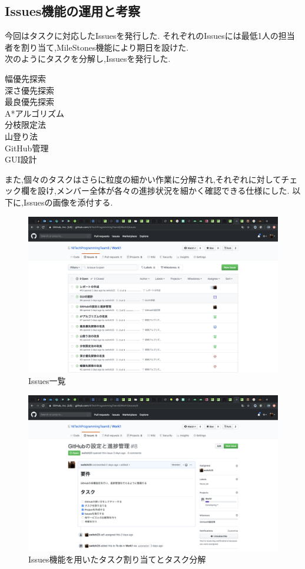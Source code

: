 ﻿\documentclass[uplatex,12pt]{jsarticle}
\begin{document}
\subsection{Issues機能の運用と考察}
今回はタスクに対応したIssuesを発行した.
それぞれのIssuesには最低1人の担当者を割り当て,MileStones機能により期日を設けた. \\
次のようにタスクを分解し,Issuesを発行した.
\begin{description}
  \item[幅優先探索]
  \item[深さ優先探索]
  \item[最良優先探索]
  \item[A*アルゴリズム]
  \item[分枝限定法]
  \item[山登り法]
  \item[GitHub管理]
  \item[GUI設計]     
\end{description}
また,個々のタスクはさらに粒度の細かい作業に分解され,それぞれに対してチェック欄を設け,メンバー全体が各々の進捗状況を細かく確認できる仕様にした.
以下に,Issuesの画像を添付する.

\begin{figure}[!hbt]
  \centering
  \includegraphics[scale=0.20]{git_image/issues_list_image.png}
  \caption{Issues一覧}
\end{figure}

\begin{figure}[!hbt]
  \centering
  \includegraphics[scale=0.20]{git_image/issues_image.png}
  \caption{Issues機能を用いたタスク割り当てとタスク分解}
\end{figure}
\end{document}
